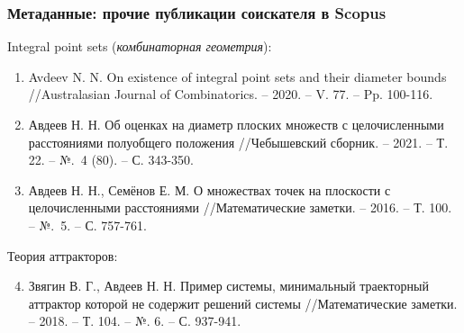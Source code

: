 \begin{frame}\frametitle{Метаданные: прочие публикации соискателя в Scopus}



	\begin{block}{Integral point sets (\textit{комбинаторная геометрия}):}
		\begin{enumerate}
			\item
				Avdeev N. N. On existence of integral point sets and their diameter bounds
				//Australasian Journal of Combinatorics. – 2020. – V. 77. – Pp. 100-116.
			\item
				Авдеев Н. Н. Об оценках на диаметр плоских множеств с целочисленными расстояниями полуобщего положения
				//Чебышевский сборник. – 2021. – Т. 22. – №.~4 (80). – С. 343-350.
			\item
				Авдеев Н. Н., Семёнов Е. М. О множествах точек на плоскости с целочисленными расстояниями
				//Математические заметки. – 2016. – Т. 100. – №.~5. – С. 757-761.
		\end{enumerate}
	\end{block}



	\begin{block}{Теория аттракторов:}
		\begin{enumerate}
			\setcounter{enumi}{3}
			\item
				Звягин В. Г., Авдеев Н. Н. Пример системы, минимальный траекторный аттрактор которой не содержит решений системы //Математические заметки. – 2018. – Т. 104. – №. 6. – С. 937-941.
		\end{enumerate}
	\end{block}

\end{frame}



